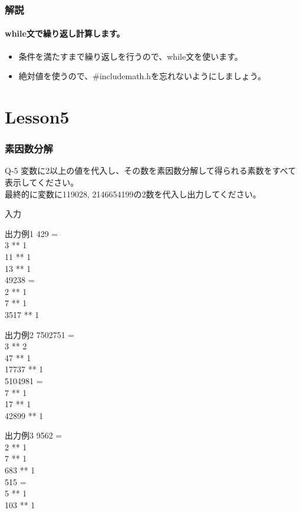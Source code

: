 \documentclass[dvipdfmx]{beamer}
\begin{document}
\begin{frame}
	\frametitle{解説}
	\framesubtitle{while文で繰り返し計算します。}
	\begin{itemize}
		\item 条件を満たすまで繰り返しを行うので、while文を使います。
		\item 絶対値を使うので、\#include\space\<math.h\>を忘れないようにしましょう。
	\end{itemize}
\end{frame}

\section{Lesson5}
\begin{frame}
	\frametitle{素因数分解}
	\begin{itembox}[l]{Q-5}
		変数に2以上の値を代入し、その数を素因数分解して得られる素数をすべて表示してください。\\
		最終的に変数に119028, 2146654199の2数を代入し出力してください。
	\end{itembox}
	\begin{block}{入力}
	\end{block}
	\begin{block}{出力例1}
		429 =\\
		3 ** 1\\
		11 ** 1\\
		13 ** 1\\
		49238 =\\
		2 ** 1\\
		7 ** 1\\
		3517 ** 1
	\end{block}
\end{frame}

\begin{frame}
	\begin{block}{出力例2}
		7502751 =\\
		3 ** 2\\
		47 ** 1\\
		17737 ** 1\\
		5104981 =\\
		7 ** 1\\
		17 ** 1\\
		42899 ** 1\\
	\end{block}
	\begin{block}{出力例3}
		9562 =\\
		2 ** 1\\
		7 ** 1\\
		683 ** 1\\
		515 =\\
		5 ** 1\\
		103 ** 1
	\end{block}
\end{frame}
\end{document}
